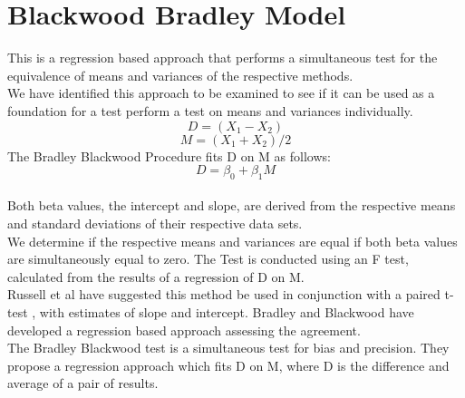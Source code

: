 \documentclass[12pt, a4paper]{report}
\theoremstyle{plain}
\theoremstyle{definition}
\theoremstyle{remark}
\begin{document}
	
	
	
	\newpage
	\section{Blackwood Bradley Model} This is a regression based
	approach that performs a simultaneous test for the equivalence of
	means and variances of the respective methods.\\We have identified
	this approach  to be examined to see if it can be used as a
	foundation for a test perform a test on
	means and variances individually.\\
	\begin{equation}
	D = (X_{1}-X_{2})
	\end{equation}
	\begin{equation}
	M = (X_{1} + X_{2}) /2
	\end{equation}
	The Bradley Blackwood Procedure fits D on M as follows:\\
	\begin{equation}
	D = \beta_{0} + \beta_{1}M
	\end{equation}
	\\Both beta values, the intercept and slope, are derived from the respective means and
	standard deviations of their respective data sets.\\
	We determine if the respective means and variances are equal if
	both beta values are simultaneously equal to zero. The Test is
	conducted using an F test, calculated from the results of a
	regression of D on M.
	\\
	Russell et al have suggested this method be used in conjunction
	with a paired t-test , with estimates of slope and intercept.
	Bradley and Blackwood have developed a regression based approach
	assessing the agreement.
	\\
	The Bradley Blackwood test is a simultaneous test for bias and
	precision. They propose a regression approach which fits D on M,
	where D is the difference and average of a pair of results.
	
	
\end{document}

